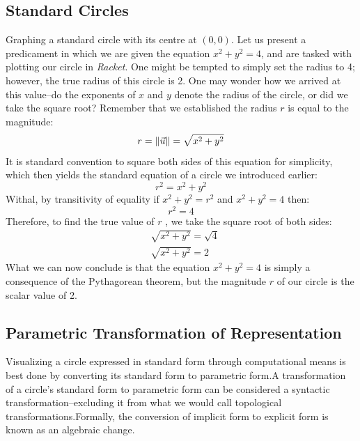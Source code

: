 \documentclass[12pt, letterpaper]{article}
\newcommand{\iRac}{\textit{Racket}}
\newcommand{\Lr}{\(r\) }
\begin{document}
	\subsection{Standard Circles}
	Graphing a standard circle with its centre at \((0,0)\).
	Let us present a predicament in which we are given the equation \(x^2 + y^2 = 4\), and are tasked with plotting our circle in \iRac. One might be tempted to simply set the radius to 4; however, the true radius of this circle is 2. One may wonder how we arrived at this value--do the exponents of \(x\) and \(y\) denote the radius of the circle, or did we take the square root? Remember that we established the radius \Lr is equal to the magnitude:
	\begin{equation*}
		r = \left\lVert\vec{u}\right\rVert = \sqrt{x^{2}+y^{2}}
	\end{equation*}
	It is standard convention to square both sides of this equation for simplicity, which then yields the standard equation of a circle we introduced earlier:
	\begin{equation*}
		r^2 = x^{2}+y^{2}
	\end{equation*}
	Withal, by transitivity of equality if \(x^2 + y^2 = r^2\) and \(x^2 + y^2 = 4\) then:\ftC
	\begin{equation*}
		r^2 = 4
	\end{equation*}
	Therefore, to find the true value of \Lr, we take the square root of both sides:
	\begin{equation*}
		\begin{split}
			&\sqrt{x^2 + y^2} = \sqrt{4} \\
			&\sqrt{x^{2}+y^{2}}=2
		\end{split}
	\end{equation*}
	What we can now conclude is that the equation \(x^{2}+y^{2}=4\) is simply a consequence of the Pythagorean theorem, but the magnitude \Lr of our circle is the scalar value of 2.
	
	\subsection{Parametric Transformation of Representation}
	Visualizing a circle expressed in standard form through computational means is best done by converting its standard form to parametric form.\ftB A transformation of a circle's standard form to parametric form can be considered a syntactic transformation--excluding it from what we would call topological transformations.\ftD Formally, the conversion of implicit form to explicit form is known as an algebraic change.
	
\end{document}
